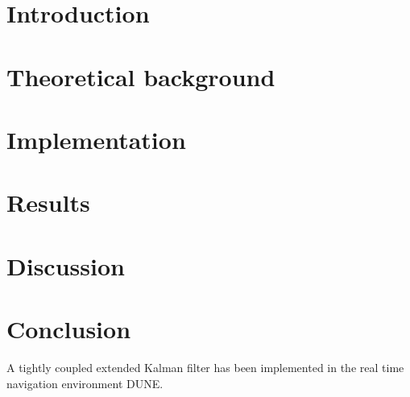 \documentclass[pdftex,10pt,b5paper,twoside]{book}
\begin{document}

\listoftodos

\tableofcontents
\listoffigures
\listoftables

\chapter{Introduction}
    
\newpage
\chapter{Theoretical background}
    
\newpage
\chapter{Implementation}
    
\newpage
\chapter{Results}
    \label{ch:results}
    
\newpage
\chapter{Discussion}
    \label{ch:discussion}
    
\newpage
\chapter{Conclusion}
    \label{ch:conclusion}
    
    A tightly coupled extended Kalman filter has been implemented in the real time navigation environment DUNE.

    


    
\end{document}
